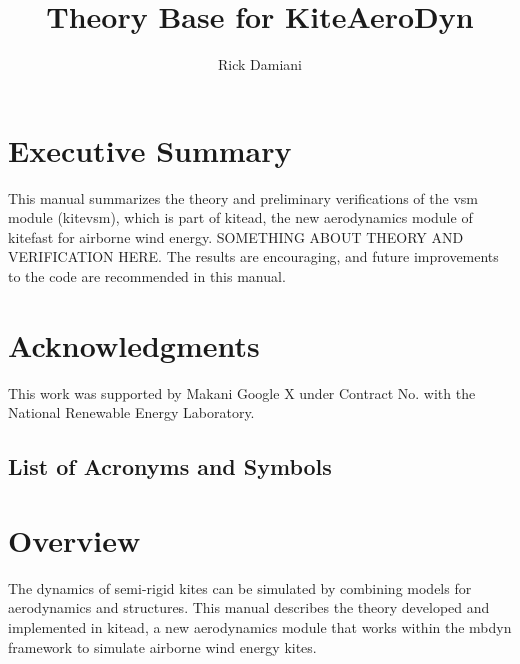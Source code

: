 \documentclass[report]{nrel}
\author{Rick Damiani}
\title{Theory Base for KiteAeroDyn}
\let\firstchar\lowercase
\let\oldprintglossary\printglossary
\def\printglossary{\let\firstchar\uppercase\oldprintglossary}
\begin{document}
\glsdisablehyper

\frontmatter
\setcounter{page}{4}
\chapter*{Executive Summary}
This manual summarizes the theory and preliminary verifications of the \gls{vsm} module (\gls{kitevsm}), which is part of \gls{kitead}, the new aerodynamics module of \gls{kitefast} for airborne wind energy. SOMETHING ABOUT THEORY AND VERIFICATION HERE. The results are encouraging, and future improvements to the code are recommended in this manual. 
\chapter*{Acknowledgments}
This work was supported by Makani Google X  under Contract No. with the National Renewable Energy Laboratory. 

\glsresetall


\tableofcontents

\listoffigures
\listoftables
\section*{\Large{List of Acronyms and Symbols}}\label{sec:symbols}
\printglossary[type=\acronymtype,style=long]
\printglossary[type=symbols,style=long, title=Symbols]
\printglossary[type=greek,style=long, title=Greek Symbols]
\let\firstchar\lowercase %

\mainmatter
\lstset{language=[LaTeX]Tex,columns=fullflexible,keepspaces=true,breaklines=true}




\chapter{Overview}\label{sec:overview}
	
	The dynamics of semi-rigid kites can be simulated by combining  models for aerodynamics and structures. This manual describes the theory developed and implemented in \gls{kitead}, a new aerodynamics module that works within the \gls{mbdyn} framework to simulate airborne wind energy kites.
	
\end{document}
